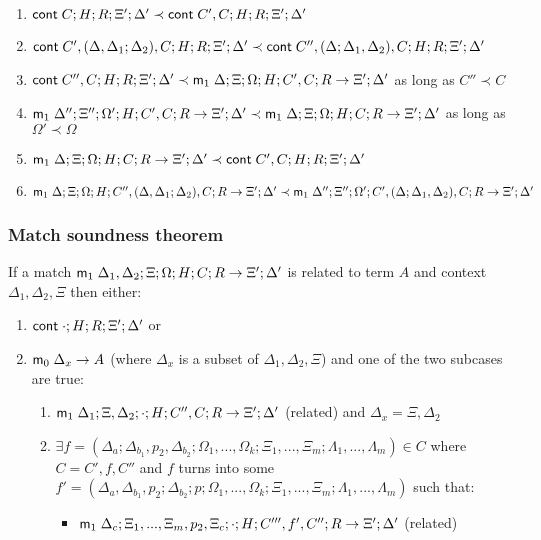 \begin{enumerate}
   \item $\mathsf{cont} \; C; H; R; \Xi'; \Delta' \prec \mathsf{cont} \; C', C; H; R; \Xi'; \Delta'$
   \item $\mathsf{cont} \; C', (\Delta, \Delta_1; \Delta_2), C; H; R; \Xi'; \Delta' \prec \mathsf{cont} \; C'', (\Delta; \Delta_1, \Delta_2), C; H; R; \Xi'; \Delta'$
   \item $\mathsf{cont} \; C'', C; H; R; \Xi'; \Delta' \prec \mathsf{m}_1 \; \Delta; \Xi; \Omega; H; C', C; R \rightarrow \Xi'; \Delta'$ as long as $C'' \prec C$
   \item $\mathsf{m}_1 \; \Delta''; \Xi''; \Omega'; H; C', C; R \rightarrow \Xi'; \Delta' \prec \mathsf{m}_1 \; \Delta; \Xi; \Omega; H; C; R \rightarrow \Xi'; \Delta'$ as long as $\Omega' \prec \Omega$
   \item $\mathsf{m}_1 \; \Delta; \Xi; \Omega; H; C; R \rightarrow \Xi'; \Delta' \prec \mathsf{cont} \; C', C; H; R; \Xi'; \Delta'$
   \item $\mathsf{m}_1 \; \Delta; \Xi; \Omega; H; C'', (\Delta, \Delta_1; \Delta_2), C; R \rightarrow \Xi'; \Delta' \prec \mathsf{m}_1 \; \Delta''; \Xi''; \Omega'; C', (\Delta; \Delta_1, \Delta_2), C; R \rightarrow \Xi'; \Delta'$
\end{enumerate}

\subsubsection{Match soundness theorem}\label{thm:match_soundness_basic}

If a match $\mathsf{m}_1 \; \Delta_1, \Delta_2; \Xi; \Omega; H; C; R \rightarrow \Xi'; \Delta'$ is related to term $A$ and context $\Delta_1, \Delta_2, \Xi$ then either:\\
\begin{enumerate}
   \item $\mathsf{cont} \; \cdot; H; R; \Xi'; \Delta'$ or
   \item $\mathsf{m}_0 \; \Delta_x \rightarrow A$ (where $\Delta_x$ is a subset of $\Delta_1, \Delta_2, \Xi$) and one of the two subcases are true:
      \begin{enumerate}
         \item $\mathsf{m}_1 \; \Delta_1; \Xi, \Delta_2; \cdot; H; C'', C; R \rightarrow \Xi'; \Delta'$ (related) and $\Delta_x = \Xi, \Delta_2$
         \item $\exists f = (\Delta_a; \Delta_{b_1}, p_2, \Delta_{b_2}; \Omega_1, ..., \Omega_k; \Xi_1, ..., \Xi_m; \Lambda_1, ..., \Lambda_m) \in C$ where $C = C', f, C''$ and $f$ turns into some $f' = (\Delta_a, \Delta_{b_1}, p_2; \Delta_{b_2}; p; \Omega_1, ..., \Omega_k; \Xi_1, ..., \Xi_m; \Lambda_1, ..., \Lambda_m)$ such that:
            \begin{itemize}
               \item $\mathsf{m}_1 \; \Delta_c; \Xi_1, ..., \Xi_m, p_2, \Xi_c; \cdot; H; C''', f', C''; R \rightarrow \Xi'; \Delta'$ (related)
            \end{itemize}
      \end{enumerate}
\end{enumerate}


